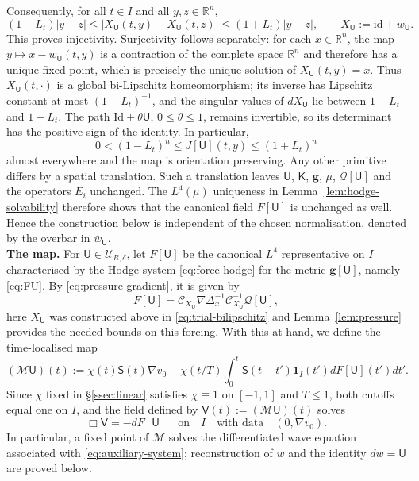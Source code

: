\documentclass[11pt,reqno]{amsart}
\theoremstyle{plain}
\theoremstyle{definition}
\theoremstyle{remark}
\numberwithin{equation}{section}
\newcommand{\Ufield}{\mathsf U}
\newcommand{\Kmat}{\mathsf K}
\newcommand{\Vfield}{\mathsf V}
\newcommand{\gmetric}{\mathbf g}
\newcommand{\Sprop}{\mathsf S}
\newcommand{\Real}{\mathbb R}
\newcommand{\Rn}{\Real^n}
\begin{document}
Consequently, for all $t\in I$ and all $y,z\in\Rn$,
\begin{equation}\label{eq:trial-bilipschitz}
 (1-L_t)|y-z|
 \le|X_{\Ufield}(t,y)-X_{\Ufield}(t,z)|
 \le(1+L_t)|y-z|,
 \qquad X_{\Ufield}:=\mathrm{id}+\bar w_{\Ufield}.
\end{equation}
This proves injectivity.  Surjectivity follows separately: for each $x\in\Rn$, the map
$y\mapsto x-\bar w_{\Ufield}(t,y)$ is a contraction of the complete space
$\Rn$ and therefore has a unique fixed point, which is precisely the unique
solution of $X_{\Ufield}(t,y)=x$.  Thus $X_{\Ufield}(t,\cdot)$ is a global
bi-Lipschitz homeomorphism; its inverse has Lipschitz constant at most
$(1-L_t)^{-1}$, and the singular values of $dX_{\Ufield}$ lie between
$1-L_t$ and $1+L_t$.  The path
$\mathrm{Id}+\theta\Ufield$, $0\le\theta\le1$, remains invertible, so its
determinant has the positive sign of the identity.  In particular,
\[
 0<(1-L_t)^n\le J[\Ufield](t,y)\le(1+L_t)^n
\]
almost everywhere and the map is orientation preserving. Any other primitive
differs by a spatial translation. Such a translation leaves $\Ufield$,
$\Kmat$, $\gmetric$, $\mu$, $\mathcal Q[\Ufield]$ and the operators $E_i$
unchanged. The $L^4(\mu)$ uniqueness in Lemma~\ref{lem:hodge-solvability}
therefore shows that the canonical field $F[\Ufield]$ is unchanged as well.
Hence the construction below is independent of the chosen normalisation,
denoted by the overbar in $\bar w_\Ufield$.\\

\textbf{The map.} For $\Ufield\in\mathcal U_{R,\delta}$, let $F[\Ufield]$ be the canonical
$L^4$ representative on $I$ characterised by the Hodge system
\eqref{eq:force-hodge} for the metric $\gmetric[\Ufield]$, namely \eqref{eq:FU}. By
\eqref{eq:pressure-gradient}, it is given by
\[
 F[\Ufield]
 =\mathcal C_{X_{\Ufield}}\nabla\Delta_{x}^{-1}\mathcal C_{X_{\Ufield}}^{-1}\mathcal Q[\Ufield],
\]
here $X_\Ufield$ was constructed above in \eqref{eq:trial-bilipschitz} and Lemma~\ref{lem:pressure} provides the needed bounds on this forcing.  With this at hand, we define the time-localised map
\begin{equation}\label{eq:differential-map}
 (\mathcal M\Ufield)(t)
 :=\chi(t)\Sprop(t)\nabla v_0
 -\chi(t/T)\int_0^t\Sprop(t-t')
       \mathbf 1_I(t')dF[\Ufield](t') dt'.
\end{equation}
Since $\chi$ fixed in \S \ref{ssec:linear} satisfies $\chi\equiv1$ on $[-1,1]$ and $T\le1$, both cutoffs equal one on $I$, and
the field defined by $\Vfield(t):=(\mathcal M\Ufield)(t)$ solves
\[
    \Box\Vfield=-dF[\Ufield] \quad \text{on} \quad I \quad \text{with data} \quad (0,\nabla v_0).
\]
In particular, a fixed point of $\mathcal{M}$ solves the differentiated wave
equation associated with \eqref{eq:auxiliary-system}; reconstruction of $w$ and
the identity $dw=\Ufield$ are proved below.
\end{document}
